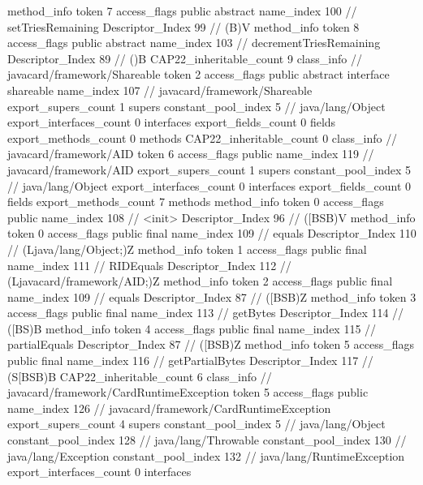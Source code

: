 {{{{{				}
				method_info {
					token	7
					access_flags	public abstract
					name_index	100		// setTriesRemaining
					Descriptor_Index	99		// (B)V
				}
				method_info {
					token	8
					access_flags	public abstract
					name_index	103		// decrementTriesRemaining
					Descriptor_Index	89		// ()B
				}
			}
			CAP22_inheritable_count	9
		}
		class_info {		// javacard/framework/Shareable
			token	2
			access_flags	public abstract interface shareable
			name_index	107		// javacard/framework/Shareable
			export_supers_count	1
			supers {
				constant_pool_index	5		// java/lang/Object
			}
			export_interfaces_count	0
			interfaces {
			}
			export_fields_count	0
			fields {
			}
			export_methods_count	0
			methods {
			}
			CAP22_inheritable_count	0
		}
		class_info {		// javacard/framework/AID
			token	6
			access_flags	public
			name_index	119		// javacard/framework/AID
			export_supers_count	1
			supers {
				constant_pool_index	5		// java/lang/Object
			}
			export_interfaces_count	0
			interfaces {
			}
			export_fields_count	0
			fields {
			}
			export_methods_count	7
			methods {
				method_info {
					token	0
					access_flags	public
					name_index	108		// <init>
					Descriptor_Index	96		// ([BSB)V
				}
				method_info {
					token	0
					access_flags	public final
					name_index	109		// equals
					Descriptor_Index	110		// (Ljava/lang/Object;)Z
				}
				method_info {
					token	1
					access_flags	public final
					name_index	111		// RIDEquals
					Descriptor_Index	112		// (Ljavacard/framework/AID;)Z
				}
				method_info {
					token	2
					access_flags	public final
					name_index	109		// equals
					Descriptor_Index	87		// ([BSB)Z
				}
				method_info {
					token	3
					access_flags	public final
					name_index	113		// getBytes
					Descriptor_Index	114		// ([BS)B
				}
				method_info {
					token	4
					access_flags	public final
					name_index	115		// partialEquals
					Descriptor_Index	87		// ([BSB)Z
				}
				method_info {
					token	5
					access_flags	public final
					name_index	116		// getPartialBytes
					Descriptor_Index	117		// (S[BSB)B
				}
			}
			CAP22_inheritable_count	6
		}
		class_info {		// javacard/framework/CardRuntimeException
			token	5
			access_flags	public
			name_index	126		// javacard/framework/CardRuntimeException
			export_supers_count	4
			supers {
				constant_pool_index	5		// java/lang/Object
				constant_pool_index	128		// java/lang/Throwable
				constant_pool_index	130		// java/lang/Exception
				constant_pool_index	132		// java/lang/RuntimeException
			}
			export_interfaces_count	0
			interfaces {
			}
}}}
